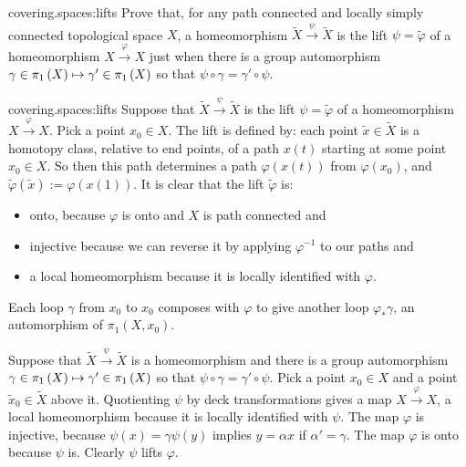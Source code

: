 \begin{problem}{covering.spaces:lifts}
Prove that, for any path connected and locally simply connected topological space \(X\), a homeomorphism $\tilde{X}\xrightarrow{\psi}\tilde{X}$ is the lift $\psi=\tilde\varphi$
of a homeomorphism $X\xrightarrow{\varphi}X$ just when there is a group automorphism 
\(
\gamma\in\pi_{1}\left(X\right)\mapsto\gamma'\in\pi_{1}\left(X\right)
\)
so that $\psi \circ \gamma = \gamma' \circ \psi$.
\end{problem}
\begin{answer}{covering.spaces:lifts}
Suppose that $\tilde{X}\xrightarrow{\psi}\tilde{X}$ is the lift $\psi=\tilde\varphi$
of a homeomorphism $X\xrightarrow{\varphi}X$.
Pick a point \(x_0\in X\).
The lift is defined by: each point \(\tilde{x}\in\tilde{X}\) is a homotopy class, relative to end points, of a path \(x(t)\) starting at some point \(x_0\in X\).
So then this path determines a path \(\varphi(x(t))\) from \(\varphi(x_0)\), and \(\tilde\varphi(\tilde{x}):=\varphi(x(1))\).
It is clear that the lift \(\tilde\varphi\) is:
\begin{itemize}
\item
onto, because \(\varphi\) is onto and \(X\) is path connected and
\item
injective because we can reverse it by applying \(\varphi^{-1}\) to our paths and
\item
a local homeomorphism because it is locally identified with \(\varphi\).
\end{itemize}
Each loop \(\gamma\) from \(x_0\) to \(x_0\) composes with \(\varphi\) to give another loop \(\varphi_*\gamma\), an automorphism of \(\pi_1(X,x_0)\).

Suppose that $\tilde{X}\xrightarrow{\psi}\tilde{X}$ is a homeomorphism and there is a group automorphism 
\(
\gamma \in \pi_{1}\left(X\right)\mapsto\gamma'\in\pi_{1}\left(X\right)
\)
so that $\psi \circ \gamma = \gamma' \circ \psi$.
Pick a point \(x_0\in X\) and a point \(\tilde{x}_0\in\tilde{X}\) above it.
Quotienting \(\psi\) by deck transformations gives a map \(X\xrightarrow{\varphi}X\), a local homeomorphism because it is locally identified with \(\psi\).
The map \(\varphi\) is injective, because \(\psi(x)=\gamma\psi(y)\) implies \(y=\alpha x\) if \(\alpha'=\gamma\).
The map \(\varphi\) is onto because \(\psi\) is.
Clearly \(\psi\) lifts \(\varphi\).
\end{answer}

